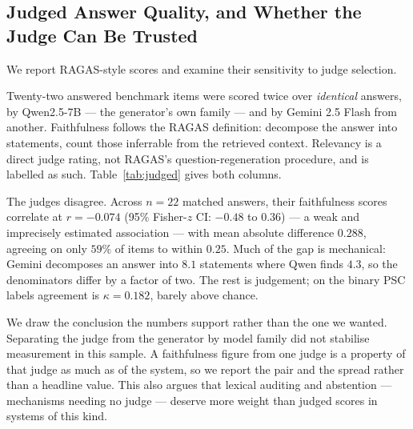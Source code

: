 \documentclass[conference]{IEEEtran}
\begin{document}
\subsection{Judged Answer Quality, and Whether the Judge Can Be Trusted}
\label{sec:judged}
We report RAGAS-style scores and examine their sensitivity to judge selection.

Twenty-two answered benchmark items were scored twice over \emph{identical}
answers, by Qwen2.5-7B --- the generator's own family --- and by Gemini 2.5
Flash from another. Faithfulness follows the RAGAS definition: decompose the
answer into statements, count those inferrable from the retrieved context.
Relevancy is a direct judge rating, not RAGAS's question-regeneration
procedure, and is labelled as such. Table~\ref{tab:judged} gives both columns.

The judges disagree. Across $n=22$ matched answers, their faithfulness scores
correlate at $r = -0.074$ (95\% Fisher-$z$ CI: $-0.48$ to $0.36$) --- a weak and
imprecisely estimated association --- with mean absolute difference $0.288$, agreeing on only $59\%$
of items to within $0.25$. Much of the gap is mechanical: Gemini decomposes an
answer into $8.1$ statements where Qwen finds $4.3$, so the denominators differ
by a factor of two. The rest is judgement; on the binary PSC labels agreement
is $\kappa = 0.182$, barely above chance.

We draw the conclusion the numbers support rather than the one we wanted.
Separating the judge from the generator by model family did not stabilise
measurement in this sample.
A faithfulness figure from one judge is a property of that judge as much as of
the system, so we report the pair and the spread rather than a headline value.
This also argues that lexical auditing and abstention --- mechanisms needing no
judge --- deserve more weight than judged scores in systems of this kind.
\end{document}
